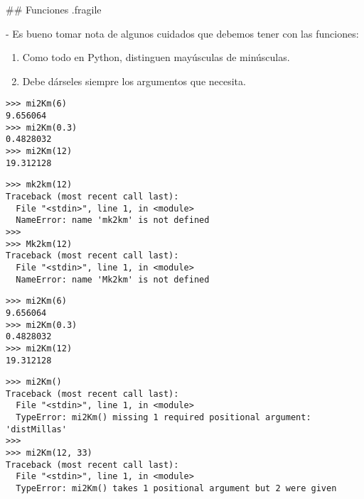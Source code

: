 ## Funciones {.fragile}


- Es bueno tomar nota de algunos cuidados que debemos tener con las funciones:


\bgnblocknormal

\begin{enumerate}
    \item<1-| alert@2> Como todo en Python, distinguen mayúsculas de minúsculas.
    \item<1-| alert@3> Debe dárseles siempre los argumentos que necesita.
\end{enumerate}

\trmblocknormal

\pause

\bgncolumns
{}

\begin{lstlisting}
>>> mi2Km(6)
9.656064
>>> mi2Km(0.3)
0.4828032
>>> mi2Km(12)
19.312128
\end{lstlisting}


\begin{lstlisting}
>>> mk2km(12)
Traceback (most recent call last):
  File "<stdin>", line 1, in <module>
  NameError: name 'mk2km' is not defined
>>>
>>> Mk2km(12)
Traceback (most recent call last):
  File "<stdin>", line 1, in <module>
  NameError: name 'Mk2km' is not defined
\end{lstlisting}

\trmcolumns
{}

\bgncolumns
{}

\begin{lstlisting}
>>> mi2Km(6)
9.656064
>>> mi2Km(0.3)
0.4828032
>>> mi2Km(12)
19.312128
\end{lstlisting}


\begin{lstlisting}
>>> mi2Km()
Traceback (most recent call last):
  File "<stdin>", line 1, in <module>
  TypeError: mi2Km() missing 1 required positional argument: 'distMillas'
>>>
>>> mi2Km(12, 33)
Traceback (most recent call last):
  File "<stdin>", line 1, in <module>
  TypeError: mi2Km() takes 1 positional argument but 2 were given
\end{lstlisting}


